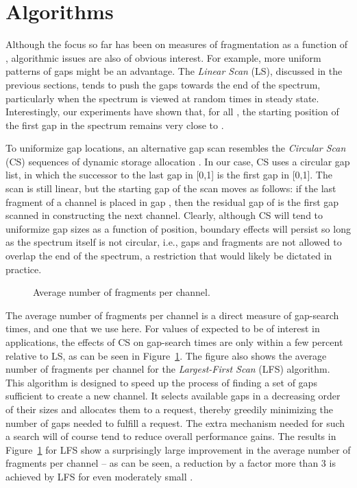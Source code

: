 \documentclass{amsart}
\begin{document}
\section{Algorithms}\label{sec:algorithms}
Although the focus so far has been on measures of fragmentation as a
function of , algorithmic issues are also of obvious
interest.  For example, more uniform patterns of gaps might be an
advantage. The \emph{Linear Scan} (LS), discussed in the previous sections, tends to push
the gaps towards the end of the spectrum, particularly when the
spectrum is viewed at random times in steady state. Interestingly,
our experiments have shown that, for all , the
starting position of the first gap in the spectrum remains very
close to .

To uniformize gap locations, an alternative
gap scan resembles the {\em Circular Scan} (CS) sequences
of dynamic storage allocation \cite{Knuth1997}. In our case, CS uses
a circular gap list, in which the successor to the last gap in [0,1]
is the first gap in [0,1]. The scan is still linear, but the
starting gap of the scan moves as follows: if the last fragment of
a channel is placed in gap , then the residual gap of  is the
first gap scanned in constructing the next channel. Clearly,
although CS will tend to uniformize gap sizes as a function of
position, boundary effects will persist so long as the spectrum
itself is not circular, i.e., gaps and fragments are not allowed to
overlap the end of the spectrum, a restriction that would likely be
dictated in practice.

\begin{figure}[!t]
\begin{center}
 \caption{Average number of fragments per channel.}
 \label{gapsearch1}
\end{center}
\end{figure}
The average number of fragments per channel is a direct measure of
gap-search times, and one that we use here. For values of 
expected to be of interest in applications, the effects of CS on
gap-search times are only within a few percent relative to LS,  as
can be seen in Figure~\ref{gapsearch1}.   The figure also shows the average number of fragments per channel for the \emph{Largest-First Scan} (LFS) algorithm. This algorithm is designed to
speed up the process of finding a set of gaps
sufficient to create a new channel. It selects available gaps in a decreasing order of their sizes and allocates them to a request, thereby greedily minimizing the
number of gaps needed to fulfill a request.
The extra mechanism
needed for such a search will of course tend to reduce overall
performance gains.  The results in Figure~\ref{gapsearch1}
for LFS show  a surprisingly large improvement in the
average number of fragments per channel -- as can be seen, a
reduction by a factor more than 3 is achieved by LFS for even
moderately small .
\end{document}
